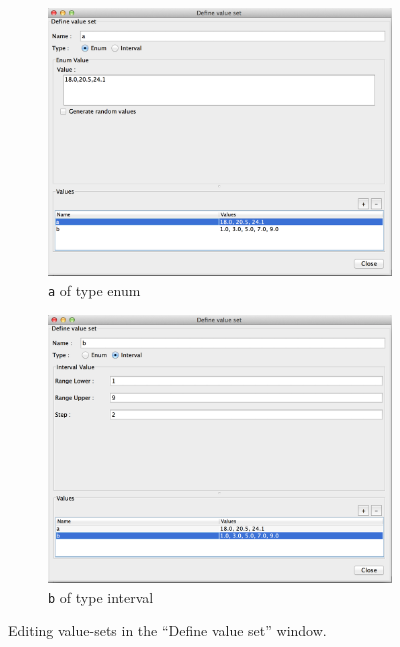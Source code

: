 \documentclass[a4paper,10pt]{report}
\begin{document}
\begin{figure}[h]
  \centering
  \begin{subfigure}[b]{0.45\textwidth}
    \includegraphics[width=\textwidth]{lr-value-set-a}
    \caption{{\tt a} of type enum}\label{fig:lr-value-set-a}
  \end{subfigure}
  \begin{subfigure}[b]{0.45\textwidth}
    \includegraphics[width=\textwidth]{lr-value-set-b}
    \caption{{\tt b} of type interval}\label{fig:lr-value-set-b}
  \end{subfigure}
  \caption{Editing value-sets in the ``Define value set'' window.}\label{fig:lr-value-set}
\end{figure}
\end{document}
